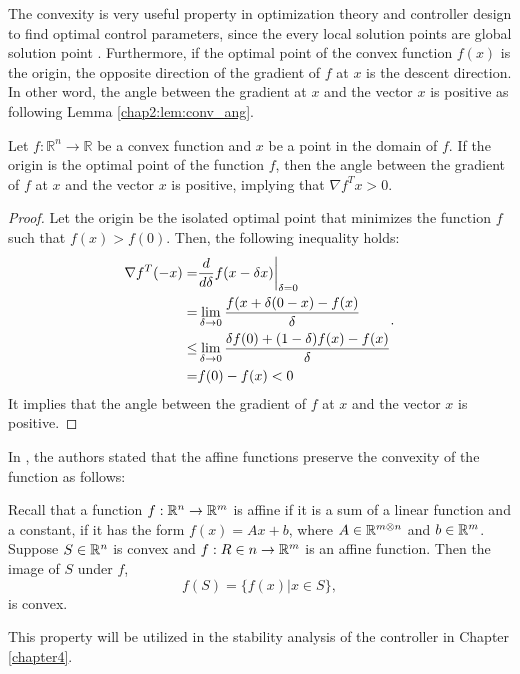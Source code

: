 The convexity is very useful property in optimization theory and controller design to find optimal control parameters, since the every local solution points are global solution point \cite[Theorem 2.5]{RN9}.
Furthermore, if the optimal point of the convex function $f(x)$ is the origin, the opposite direction of the gradient of $f$ at $x$ is the descent direction.
In other word, the angle between the gradient at $x$ and the vector $x$ is positive as following Lemma \ref{chap2:lem:conv_ang}.

\begin{lemma}
  Let $f:\mathbb R^n\to \mathbb R$ be a convex function and $x$ be a point in the domain of $f$.
  If the origin is the optimal point of the function $f$, then the angle between the gradient of $f$ at $x$ and the vector $x$ is positive, implying that $\nabla f^Tx>0$.
  \label{chap2:lem:conv_ang}
\end{lemma}

\begin{proof}
  
  Let the origin be the isolated optimal point that minimizes the function $f$ such that $f(x) > f(0)$.
  Then, the following inequality holds:
  \begin{equation}
      \begin{aligned}
          \nabla f^T (-x)
          =&
          {d\over d\delta } f( x -\delta x)\bigg\vert _{\delta=0} \\
          =& \lim_{\delta\to 0} {f( x+\delta (0-x) - f( x)\over \delta}\\
          \le& \lim_{\delta\to0} {\delta f(0) + (1-\delta) f( x )-f( x)\over \delta}
          \\
          =& f(0) - f( x) < 0
          \end{aligned}
          .
  \end{equation}
  It implies that the angle between the gradient of $f$ at $x$ and the vector $x$ is positive.

\end{proof}

In \cite[Chapter 2.3.2]{RN1}, the authors stated that the affine functions preserve the convexity of the function as follows:
\begin{displayquote}
  
  Recall that a function $f:\mathbb{R}^n\to\mathbb{R}^m$ is affine if it is a sum of a linear function and a constant, \ie if it has the form $f(x) = Ax + b$, where $A\in\mathbb{R}^{m\otimes n}$ and $b\in\mathbb{R}^m$. Suppose $S\in\mathbb{R}^n$ is convex and $f:R\in n\to\mathbb{R}^m$ is an affine function. Then the image of $S$ under $f$,
  \begin{equation}
    f(S) = \{ f(x) | x\in S \}
    ,
  \end{equation}
  is convex.

\end{displayquote}
This property will be utilized in the stability analysis of the controller in Chapter \ref{chapter4}.

